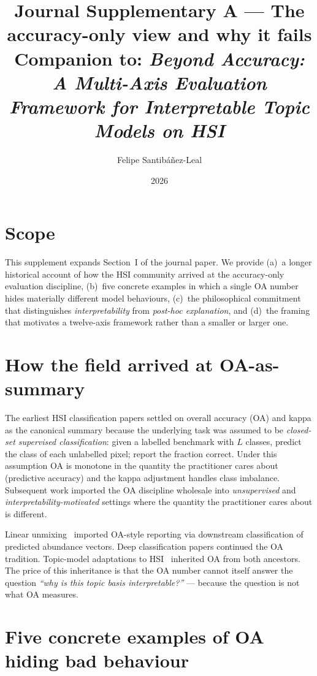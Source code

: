 \documentclass[11pt,a4paper]{article}
\title{Journal Supplementary A --- The accuracy-only view and why it fails\\
{\large Companion to: \emph{Beyond Accuracy: A Multi-Axis Evaluation
Framework for Interpretable Topic Models on HSI}}}
\author{Felipe Santib\'a\~nez-Leal}
\date{2026}
\begin{document}
\maketitle

\section{Scope}
This supplement expands Section~I of the journal paper. We provide
(a)~a longer historical account of how the HSI community arrived at
the accuracy-only evaluation discipline, (b)~five concrete examples
in which a single OA number hides materially different model
behaviours, (c)~the philosophical commitment that distinguishes
\emph{interpretability} from \emph{post-hoc explanation}, and
(d)~the framing that motivates a twelve-axis framework rather than
a smaller or larger one.

\section{How the field arrived at OA-as-summary}

The earliest HSI classification papers
\cite{plaza2009recent,camps2014advances} settled on overall accuracy
(OA) and kappa as the canonical summary because the underlying task
was assumed to be \emph{closed-set supervised classification}: given
a labelled benchmark with $L$ classes, predict the class of each
unlabelled pixel; report the fraction correct. Under this
assumption OA is monotone in the quantity the practitioner cares
about (predictive accuracy) and the kappa adjustment handles class
imbalance. Subsequent work imported the OA discipline wholesale into
\emph{unsupervised} and \emph{interpretability-motivated} settings
where the quantity the practitioner cares about is different.

Linear unmixing~\cite{nascimento2005vca,bioucasdias2012unmixing}
imported OA-style reporting via downstream classification of
predicted abundance vectors. Deep classification papers
\cite{chen2014deep,paoletti2019deep} continued the OA tradition.
Topic-model adaptations to HSI~\cite{zou2017pmlda,liu2019hsilda}
inherited OA from both ancestors. The price of this inheritance is
that the OA number cannot itself answer the question
\emph{``why is this topic basis interpretable?''} --- because the
question is not what OA measures.

\section{Five concrete examples of OA hiding bad behaviour}
\end{document}
